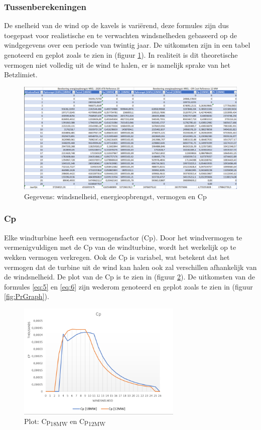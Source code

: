 \subsubsection{Tussenberekeningen}
De snelheid van de wind op de kavels is variërend, deze formules zijn dus toegepast voor realistische en te verwachten windsnelheden gebaseerd op de windgegevens over een periode van twintig jaar.\cite{WindData}
De uitkomsten zijn in een tabel genoteerd en geplot zoals te zien in (figuur \ref{fig:TVUW}). In realiteit is dit theoretische vermogen niet volledig uit de wind te halen, er is namelijk sprake van het Betzlimiet.

\begin{figure}[H]
\centering
\includegraphics[width=1\textwidth]{IMG/data/overzicht/energieopbrengst_zonder_parkeffect.PNG}
\caption{Gegevens: windsnelheid, energieopbrengst, vermogen en Cp}
\label{fig:TVUW}
\end{figure}

\subsubsection{Cp}
Elke windturbine heeft een vermogensfactor (Cp). Door het windvermogen te vermenigvuldigen met de Cp van de windturbine, wordt het werkelijk op te wekken vermogen verkregen. Ook de Cp is variabel, wat betekent dat het vermogen dat de turbine uit de wind kan halen ook zal verschillen afhankelijk van de windsnelheid. De plot van de Cp is te zien in (figuur \ref{fig:CpGraph}). De uitkomsten van de formules \ref{eq:5} en \ref{eq:6} zijn wederom genoteerd en geplot zoals te zien in (figuur \ref{fig:PrGraph}). 
\begin{figure}[H]
\centering
\includegraphics[width=0.7\textwidth]{IMG/data/overzicht/Cp_graph.PNG}
\caption{Plot: Cp\textsubscript{18MW} en Cp\textsubscript{12MW}}
\label{fig:CpGraph}
\end{figure}
